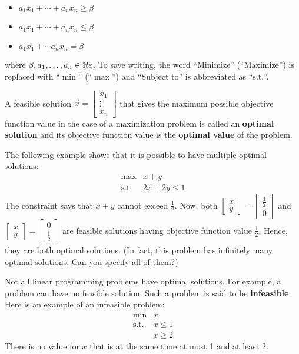 \begin{itemize}
\tightlist
\item
  \(a_1 x_1 + \cdots + a_n x_n \geq \beta\)
\item
  \(a_1 x_1 + \cdots + a_n x_n \leq \beta\)
\item
  \(a_1 x_1 + \cdots a_n x_n = \beta\)
\end{itemize}

where \(\beta, a_1,\ldots, a_n \in \Re e\). To save writing, the word
``Minimize'' (``Maximize'') is replaced with ``\(\min\)'' (``\(\max\)'')
and ``Subject to'' is abbreviated as ``\(\text{s.t.}\)''.

A feasible solution
\(\vec{x} = \begin{bmatrix} x_1 \\ \vdots \\ x_n\end{bmatrix}\) that
gives the maximum possible objective function value in the case of a
maximization problem is called an \textbf{optimal solution} and its
objective function value is the \textbf{optimal value} of the problem.

The following example shows that it is possible to have multiple optimal
solutions: \[
\begin{array}{rl}
\max & x + y\\
\text{s.t.} &  2x + 2y\leq 1
\end{array}
\] The constraint says that \(x+y\) cannot exceed \(\frac{1}{2}\). Now,
both
\(\begin{bmatrix}x\\y\end{bmatrix} = \begin{bmatrix}\frac{1}{2}\\ 0\end{bmatrix}\)
and
\(\begin{bmatrix}x\\y\end{bmatrix} = \begin{bmatrix}0\\\frac{1}{2}\end{bmatrix}\)
are feasible solutions having objective function value \(\frac{1}{2}\).
Hence, they are both optimal solutions. (In fact, this problem has
infinitely many optimal solutions. Can you specify all of them?)

Not all linear programming problems have optimal solutions. For example,
a problem can have no feasible solution. Such a problem is said to be
\textbf{infeasible}. Here is an example of an infeasible problem: \[
\begin{array}{rl}
\min & x \\
\text{s.t.} &  x \leq 1 \\
& x \geq 2
\end{array}
\] There is no value for \(x\) that is at the same time at most 1 and at
least 2.

